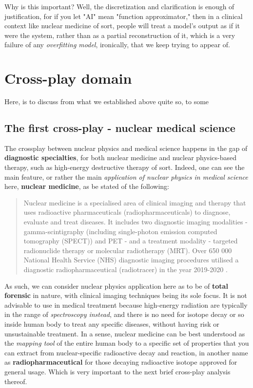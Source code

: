 \documentclass[9pt,a4paper]{article}
\begin{document}
Why is this important? Well, the discretization and clarification is enough of justification, for if you let "AI" mean "function approximator," then in a clinical context like nuclear medicine of sort, people will treat a model's output as if it were the system, rather than as a partial reconstruction of it, which is a very failure of any \textit{overfitting model}, ironically, that we keep trying to appear of. 
\section{Cross-play domain}

Here, is to discuss from what we established above quite so, to some 

\subsection{The first cross-play - nuclear medical science}

The crossplay between nuclear physics and medical science happens in the gap of \textbf{diagnostic specialties}, for both nuclear medicine and nuclear physics-based therapy, such as high-energy destructive therapy of sort. Indeed, one can see the main feature, or rather the main \textit{application of nuclear physics in medical science} here, \textbf{nuclear medicine}, as be stated of the following: 

\begin{quote}
    Nuclear medicine is a specialised area of clinical imaging and therapy that uses radioactive pharmaceuticals (radiopharmaceuticals) to diagnose, evaluate and treat diseases. It includes two diagnostic imaging modalities - gamma-scintigraphy (including single-photon emission computed tomography (SPECT)) and PET - and a treatment modality - targeted radionuclide therapy or molecular radiotherapy (MRT). Over 650 000 National Health Service (NHS) diagnostic imaging procedures utilised a diagnostic radiopharmaceutical (radiotracer) in the year 2019-2020 \cite{young2021overview}. 
\end{quote}

As such, we can consider nuclear physics application here as to be of \textbf{total forensic}\cite{pubmed7137928,mehndiratta2014nuclear} in nature, with clinical imaging techniques being its sole focus. It is not advisable to use in medical treatment because high-energy radiation are typically in the range of \textit{spectroscopy instead}, and there is no need for isotope decay or so inside human body to treat any specific diseases, without having risk or unsustainable treatment. In a sense, nuclear medicine can be best understood as the \textit{mapping tool}\cite{cmii2018overview} of the entire human body to a specific set of properties that you can extract from nuclear-specific radioactive decay and reaction, in another name as \textbf{radiopharmaceutical} for those decaying radioactive isotope approved for general usage. Which is very important to the next brief cross-play analysis thereof. 
\end{document}
